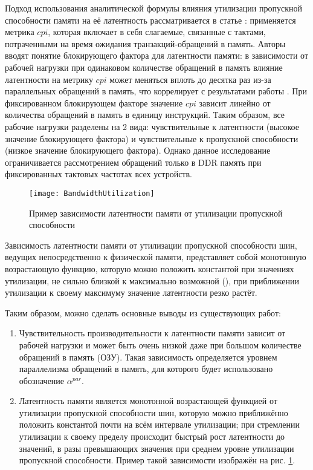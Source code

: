     Подход использования аналитической формулы влияния утилизации пропускной способности памяти на
    её латентность рассматривается в статье \cite{clapp2015quantifying}: применяется
    метрика $cpi$, которая включает в себя слагаемые, связанные с тактами, потраченными
    на время ожидания транзакций-обращений в память. Авторы вводят понятие блокирующего фактора
    для латентности памяти: в зависимости от рабочей нагрузки при одинаковом количестве обращений в память
    влияние латентности на метрику $cpi$ может меняться вплоть до десятка раз из-за параллельных
    обращений в память, что коррелирует с результатами работы \cite{keramidas2010interval}.
    При фиксированном блокирующем факторе значение $cpi$ зависит линейно от количества обращений
    в память в единицу инструкций.
    Таким образом, все рабочие нагрузки разделены на 2 вида: чувствительные к латентности (высокое
    значение блокирующего фактора) и чувствительные к пропускной способности (низкое значение
    блокирующего фактора).
    Однако данное исследование ограничивается рассмотрением обращений только в DDR память
    при фиксированных тактовых частотах всех устройств.

    \begin{figure}[!h]
        \caption{Пример зависимости латентности памяти от утилизации пропускной способности}
        \centering
        \texttt{[image: BandwidthUtilization]}
        \label{mem_lat}
    \end{figure}

    Зависимость латентности памяти от утилизации пропускной способности шин, ведущих непосредственно к
    физической памяти, представляет собой монотонную
    возрастающую функцию, которую можно положить константой при значениях утилизации, не сильно близкой
    к максимально возможной (\cite{david2011memory}), при приближении утилизации к своему максимуму
    значение латентности резко растёт.

    Таким образом, можно сделать основные выводы из существующих работ:
    \begin{enumerate}
        \item Чувствительность производительности к латентности памяти зависит от рабочей нагрузки и может
        быть очень низкой даже при большом количестве обращений в память (ОЗУ). Такая зависимость
        определяется уровнем параллелизма обращений в память, для которого будет использовано обозначение
        $\alpha^{par}$.
        \item Латентность памяти является монотонной возрастающей функцией от утилизации пропускной
        способности шин, которую можно приближённо положить константой почти на всём интервале утилизации;
        при стремлении утилизации к своему пределу происходит быстрый рост латентности до значений,
        в разы превышающих значения при среднем уровне утилизации пропускной способности.
        Пример такой зависимости изображён на рис. \ref{mem_lat}.
    \end{enumerate}

